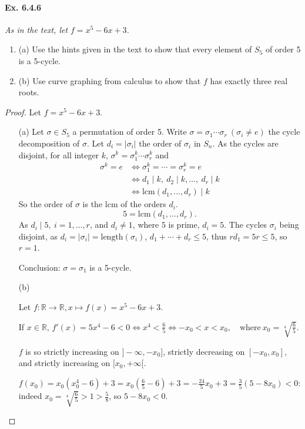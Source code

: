 \documentclass[11pt,a4paper]{article}
\newcommand{\be} {\begin{enumerate}}
\newcommand{\ee} {\end{enumerate}}
\newcommand{\R}{\mathbb{R}}
\begin{document}
\paragraph{Ex. 6.4.6}

{\it As in the text, let $f = x^5-6x+3$.
\be
\item[(a)] Use the hints given in the text to show that every element of $S_5$ of order 5 is a 5-cycle.
\item[(b)] Use curve graphing from calculus to show that $f$ has exactly three real roots.
\ee
}

\begin{proof}
Let $f = x^5-6x+3$.
\begin{enumerate}
\item[(a)]
Let $\sigma \in S_5$ a permutation of order 5. Write $\sigma = \sigma_1\cdots\sigma_r \  (\sigma_i\neq e)$ the cycle decomposition of $\sigma$. Let $d_i = |\sigma_i|$ the order of $\sigma_i$ in $S_n$. As the cycles are disjoint, for all integer $k$, 
$\sigma ^k = \sigma_1^k \cdots \sigma_r^k$ and
\begin{align*}
\sigma^k = e &\iff \sigma_1^k = \cdots = \sigma_r^k = e\\
&\iff d_1 \mid k,\ d_2 \mid k,\ldots,\ d_r \mid k\\
&\iff \mathrm{lcm}(d_1,\ldots,d_r) \mid k
\end{align*}
So the order of $\sigma$ is the lcm of the orders $d_i$.
$$5 = \mathrm{lcm}(d_1,\ldots,d_r).$$
As $d_i \mid 5, \ i=1,\ldots,r$, and $d_i\neq 1$, where $5$ is prime, $d_i = 5$. The cycles $\sigma_i$ being disjoint, as $d_i = |\sigma_i| =  \mathrm{length}(\sigma_i)$, $d_1+\cdots+d_r\leq 5$, thus $rd_1 = 5r\leq 5$, so $r=1$.

Conclusion:  $\sigma = \sigma_1$ is a 5-cycle.

\item[(b)]

Let $f : \R \to \R, x\mapsto f(x) = x^5-6x+3$.

If $x\in \R$, $f'(x) = 5x^4-6 <  0 \iff x^4 < \frac{6}{5} \iff -x_0 < x < x_0,\quad \mathrm{where} \ x_0 =  \sqrt[4]{\frac{6}{5}}$.

$f$ is so strictly increasing on $]-\infty,-x_0]$, strictly decreasing on  $[-x_0,x_0]$, and strictly increasing on $[x_0,+\infty[$.

$f(x_0) = x_0(x_0^4-6)+3 = x_0(\frac{6}{5} - 6) + 3 = -\frac{24}{5}x_0 + 3 = \frac{3}{5}(5-8x_0)<0$: indeed $x_0=\sqrt[4]{\frac{6}{5}}> 1 > \frac{5}{8}$, so $5 - 8x_0 <0 $.


\end{enumerate}
\end{proof}
\end{document}
